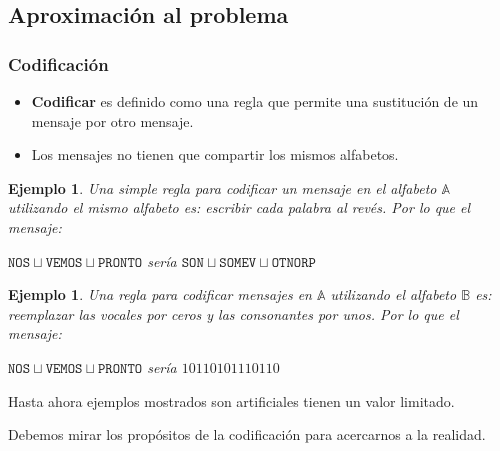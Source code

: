 \documentclass{beamer}
\newtheorem{ejemplo} [Ejemplo] {Ejemplo}
\begin{document}
\subsection{Aproximación al problema}

\begin{frame}   \frametitle{Codificación} 

\begin{itemize}
\item \textbf{Codificar} es definido como una regla que permite una sustitución de un mensaje por otro mensaje.
\item Los mensajes no tienen que compartir los mismos alfabetos.
\end{itemize}
    

\begin{ejemplo}
Una simple regla para codificar un mensaje en el alfabeto $\mathbb{A}$  utilizando el mismo alfabeto es: \textit{escribir cada palabra al revés}. Por lo que el mensaje:


\begin{center}
$\mathtt{NOS}\sqcup\mathtt{VEMOS}\sqcup\mathtt{PRONTO}$   sería   $\mathtt{SON}\sqcup\mathtt{SOMEV}\sqcup\mathtt{OTNORP}$ 
\end{center}

\end{ejemplo}

\end{frame}


\begin{frame} 

\begin{ejemplo}
Una regla para codificar mensajes en $\mathbb{A}$  utilizando el alfabeto $\mathbb{B}$ es: \textit{reemplazar las vocales por ceros y las consonantes por unos}. Por lo que el mensaje:

\begin{center}
$\mathtt{NOS}\sqcup\mathtt{VEMOS}\sqcup\mathtt{PRONTO}$   sería  $10110101110110$
\end{center}
   
    \end{ejemplo}
    
Hasta ahora ejemplos mostrados son artificiales tienen un valor limitado.\\
\vspace{0,5cm}

Debemos mirar los propósitos de la codificación para acercarnos a la realidad. 

\end{frame}
\end{document}
